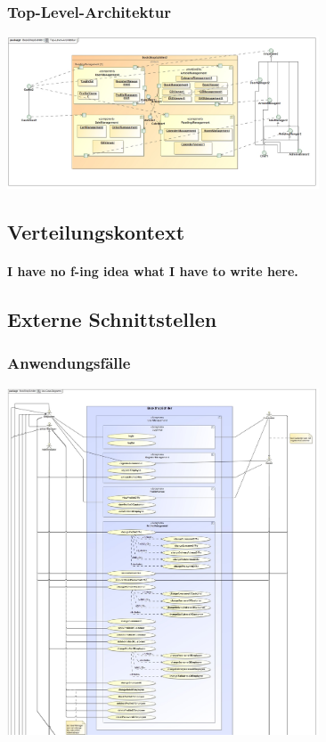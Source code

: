 \documentclass[a4paper]{article}
\begin{document}
\subsubsection{Top-Level-Architektur}

\includegraphics[width=350px]{top-level-architektur.jpg}

\subsection{Verteilungskontext}

\paragraph{I have no f-ing idea what I have to write here.}

\subsection{Externe Schnittstellen}

\subsubsection{Anwendungsfälle}

\includegraphics[width=350px]{use-case-diagramm-part1.jpg}
\end{document}
